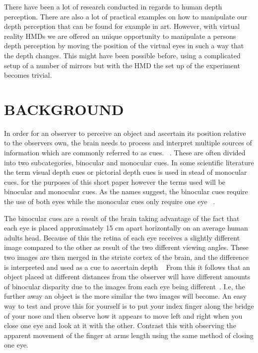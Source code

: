 \documentclass[tog]{acmsiggraph}
\begin{document}
There have been a lot of research conducted in regards to human depth perception. There are also a lot of practical examples on how to manipulate our depth perception that can be found for example in art. However, with virtual reality HMDs we are offered an unique opportunity to manipulate a persons depth perception by moving the position of the virtual eyes in such a way that the depth changes. This might have been possible before, using a complicated setup of a number of mirrors but with the HMD the set up of the experiment becomes trivial.  


\section{BACKGROUND}
In order for an observer to perceive an object and ascertain its position relative to the observers own, the brain needs to process and interpret multiple sources of information which are commonly referred to as cues. ~\cite {Reichelt et al:2010:DPHV}. These are often divided into two subcategories, binocular and monocular cues. In some scientific literature the term visual depth cues or pictorial depth cues is used in stead of monocular cues. for the purposes of this short paper however the terms used will be binocular and monocular cues. As the names suggest, the binocular cues require the use of both eyes while the monocular cues only require one eye ~\cite {Pfautz:2002:DPCG}.

The binocular cues are a result of the brain taking advantage of the fact that each eye is placed approximately 15 cm apart horizontally on an average human adults head. Because of this the retina of each eye receives a slightly different image compared to the other as result of the two different viewing angles. These two images are then merged in the striate cortex of the brain, and the difference is interpreted and used as a cue to ascertain depth ~\cite{Reichelt et al:2010:DPHV} From this it follows that an object placed at different distances from the observer will have different amounts of binocular disparity due to the images from each eye being different~\cite {Boyd:2000:DPC}. I.e, the further away an object is the more similar the two images will become. An easy way to test and prove this for yourself is to put your index finger along the bridge of your nose and then observe how it appears to move left and right when you close one eye and look at it with the other. Contrast this with observing the apparent movement of the finger at arms length using the same method of closing one eye.   
\end{document}
